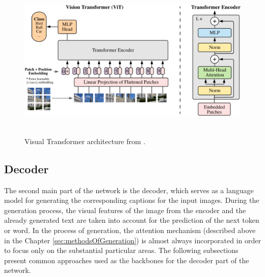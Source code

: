 \begin{figure}[h]\centering
\includegraphics[width=145mm, height=76mm]{../img/VisualTransformerArchitecture}
\caption{Visual Transformer architecture from \citet{dosovitskiy2020image}.}
\label{fig02:ViT}
\end{figure}

\subsection{Decoder}
The second main part of the network is the decoder, which serves as a language model for generating the corresponding captions for the input images. During the generation process, the visual features of the image from the encoder and the already generated text are taken into account for the prediction of the next token or word. In the process of generation, the attention mechanism (described above in the Chapter \ref{sec:methodsOfGeneration}) is almost always incorporated in order to focus only on the substantial particular areas. The following subsections present common approaches used as the backbones for the decoder part of the network.

